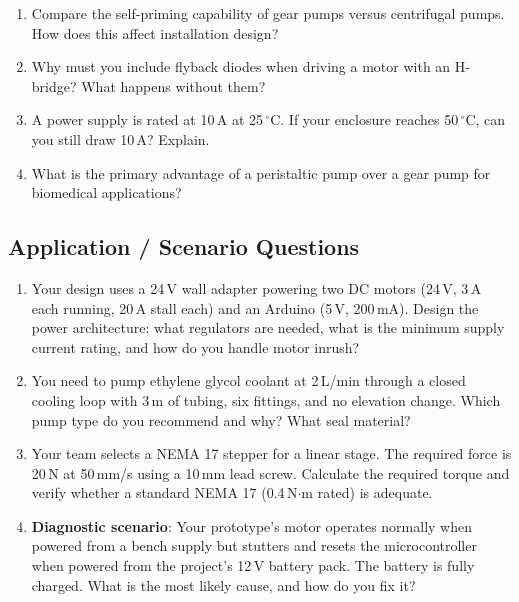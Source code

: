 \documentclass[11pt,letterpaper,twoside,openany]{book}
\begin{document}
\begin{enumerate}[leftmargin=1.5em]
  \item Compare the self-priming capability of gear pumps versus centrifugal pumps. How does this affect installation design?

  \item Why must you include flyback diodes when driving a motor with an H-bridge? What happens without them?

  \item A power supply is rated at 10\,A at 25\,$^{\circ}$C. If your enclosure reaches 50\,$^{\circ}$C, can you still draw 10\,A? Explain.

  \item What is the primary advantage of a peristaltic pump over a gear pump for biomedical applications?
\end{enumerate}

\subsection{Application / Scenario Questions}

\begin{enumerate}[resume,leftmargin=1.5em]
  \item Your design uses a 24\,V wall adapter powering two DC motors (24\,V, 3\,A each running, 20\,A stall each) and an Arduino (5\,V, 200\,mA). Design the power architecture: what regulators are needed, what is the minimum supply current rating, and how do you handle motor inrush?

  \item You need to pump ethylene glycol coolant at 2\,L/min through a closed cooling loop with 3\,m of tubing, six fittings, and no elevation change. Which pump type do you recommend and why? What seal material?

  \item Your team selects a NEMA 17 stepper for a linear stage. The required force is 20\,N at 50\,mm/s using a 10\,mm lead screw. Calculate the required torque and verify whether a standard NEMA 17 (0.4\,N$\cdot$m rated) is adequate.

  \item \textbf{Diagnostic scenario}: Your prototype's motor operates normally when powered from a bench supply but stutters and resets the microcontroller when powered from the project's 12\,V battery pack. The battery is fully charged. What is the most likely cause, and how do you fix it?
\end{enumerate}
\end{document}
